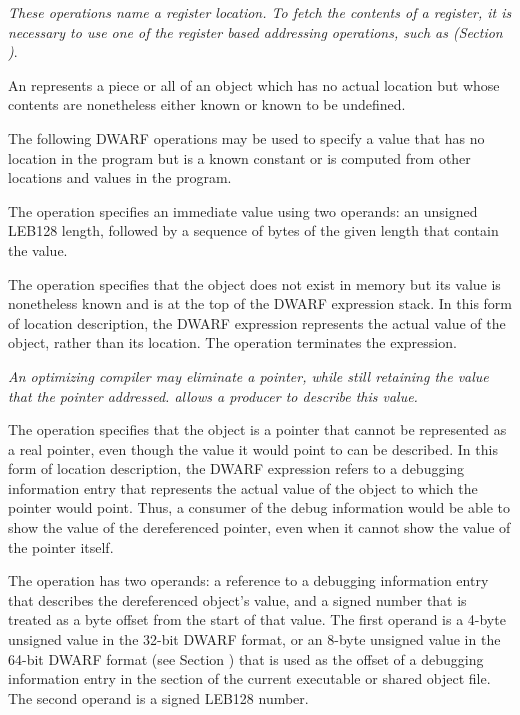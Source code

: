\textit{These operations name a register location. To
fetch the contents of a register, it is necessary to use
one of the register based addressing operations, such as
\DWOPbregx{} 
(Section )}.

\label{chap:implicitlocationdescriptions}
An 
represents a piece or all
of an object which has no actual location but whose contents
are nonetheless either known or known to be undefined.

The following DWARF operations may be used to specify a value
that has no location in the program but is a known constant
or is computed from other locations and values in the program.
\begin{enumerate}[1. ]
\itembfnl{\DWOPimplicitvalueTARG}
The \DWOPimplicitvalueNAME{} operation specifies an immediate value
using two operands: an unsigned LEB128
length, followed by a 
sequence of bytes of the given length that contain the value.

\itembfnl{\DWOPstackvalueTARG}
The \DWOPstackvalueNAME{} 
operation specifies that the object
does not exist in memory but its value is nonetheless known
and is at the top of the DWARF expression stack. In this form
of location description, the DWARF expression represents the
actual value of the object, rather than its location. The
\DWOPstackvalueNAME{} operation terminates the expression.

\itembfnl{\DWOPimplicitpointerTARG}
\textit{An optimizing compiler may eliminate a pointer, while
still retaining the value that the pointer addressed.  
\DWOPimplicitpointerNAME{} allows a producer to describe this value.}

The \DWOPimplicitpointerNAME{} operation specifies that the object
is a pointer that cannot be represented as a real pointer,
even though the value it would point to can be described. In
this form of location description, the DWARF expression refers
to a debugging information entry that represents the actual
value of the object to which the pointer would point. Thus, a
consumer of the debug information would be able to show the
value of the dereferenced pointer, even when it cannot show
the value of the pointer itself.

The \DWOPimplicitpointerNAME{} operation has two operands: a 
reference to a debugging information entry that describes 
the dereferenced object's value, and a signed number that 
is treated as a byte offset from the start of that value. 
The first operand is a 4-byte unsigned value in the 32-bit 
DWARF format, or an 8-byte unsigned value in the 64-bit 
DWARF format (see Section 
)
\bb
that is used as the offset of a debugging information entry 
in the \dotdebuginfo{} section of the current executable 
or shared object file.
\eb
The second operand is a 
signed LEB128 number.
\db


\end{enumerate}
